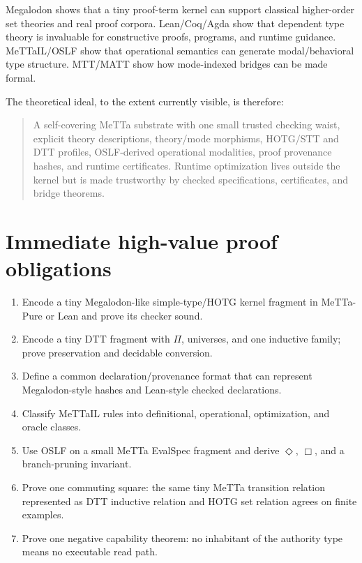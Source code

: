 \documentclass[11pt]{article}
\newcommand{\MeTTa}{\textup{MeTTa}}
\newcommand{\MeTTaIL}{\textup{MeTTaIL}}
\newcommand{\Megalodon}{\textup{Megalodon}}
\newcommand{\MTT}{\textup{MTT}}
\newcommand{\MATT}{\textup{MATT}}
\newcommand{\OSLF}{\textup{OSLF}}
\newcommand{\Lean}{\textup{Lean}}
\newcommand{\Coq}{\textup{Coq}}
\newcommand{\Agda}{\textup{Agda}}
\begin{document}
\Megalodon{} shows that a tiny proof-term kernel can support classical higher-order set theories and real proof corpora.  \Lean{}/\Coq{}/\Agda{} show that dependent type theory is invaluable for constructive proofs, programs, and runtime guidance.  \MeTTaIL{}/\OSLF{} show that operational semantics can generate modal/behavioral type structure.  \MTT{}/\MATT{} show how mode-indexed bridges can be made formal.

The theoretical ideal, to the extent currently visible, is therefore:

\begin{quote}
A self-covering \MeTTa{} substrate with one small trusted checking waist, explicit theory descriptions, theory/mode morphisms, HOTG/STT and DTT profiles, OSLF-derived operational modalities, proof provenance hashes, and runtime certificates.  Runtime optimization lives outside the kernel but is made trustworthy by checked specifications, certificates, and bridge theorems.
\end{quote}

\section{Immediate high-value proof obligations}

\begin{enumerate}
\item Encode a tiny \Megalodon{}-like simple-type/HOTG kernel fragment in \MeTTa-Pure or Lean and prove its checker sound.
\item Encode a tiny DTT fragment with \(\Pi\), universes, and one inductive family; prove preservation and decidable conversion.
\item Define a common declaration/provenance format that can represent Megalodon-style hashes and Lean-style checked declarations.
\item Classify \MeTTaIL{} rules into definitional, operational, optimization, and oracle classes.
\item Use \OSLF{} on a small \MeTTa{} EvalSpec fragment and derive \(\Diamond\), \(\Box\), and a branch-pruning invariant.
\item Prove one commuting square: the same tiny \MeTTa{} transition relation represented as DTT inductive relation and HOTG set relation agrees on finite examples.
\item Prove one negative capability theorem: no inhabitant of the authority type means no executable read path.
\end{enumerate}
\end{document}
